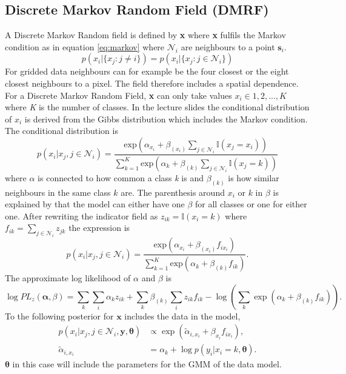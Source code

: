 \documentclass[a4paper,english]{article}
\begin{document}
\subsection{Discrete Markov Random Field (DMRF)}
A Discrete Markov Random field is defined by \textbf{x} where \textbf{x} fulfils the Markov condition as in equation \ref{eq:markov} where $\mathcal{N}_i$ are neighbours to a point $\textbf{s}_i$.
\begin{equation}
	p(x_i|\{x_j : j\neq i\}) = p(x_i|\{x_j : j\in \mathcal{N}_i\})
	\label{eq:markov}
\end{equation}
For gridded data neighbours can for example be the four closest or the eight closest neighbours to a pixel.
The field therefore includes a spatial dependence. For a Discrete Markov Random Field, \textbf{x} can only take values $x_i \in 1,2,...,K$ where \textit{K} is the number of classes. In the lecture slides the conditional distribution of $x_i$ is derived from the Gibbs distribution which includes the Markov condition. The conditional distribution is
\begin{equation}
  p(x_i|x_j,j\in \mathcal{N}_i) = \dfrac{\text{exp}(\alpha_{x_i}+\beta_{(x_i)}\sum_{j\in \mathcal{N}_i}\mathds{I}(x_j = x_i))}{\sum^K_{k=1}\text{exp}(\alpha_k + \beta_{(k)}\sum_{j\in \mathcal{N}_i}\mathds{I}(x_j = k))}
\end{equation}
where $\alpha$ is connected to how common a class \textit{k} is and $\beta_{(k)}$ is how similar neighbours in the same class $k$ are. The parenthesis around $x_i$ or $k$ in $\beta$ is explained by that the model can either have one $\beta$ for all classes or one for either one. After rewriting the indicator field as $z_{ik} = \mathds{I}(x_i = k)$ where $f_{ik} = \sum_{j\in \mathcal{N}_i} z_{jk}$ the expression is
\begin{equation}
  p(x_i|x_j,j\in \mathcal{N}_i) = \dfrac{\text{exp}(\alpha_{x_i}+\beta_{(x_i)} f_{ix_i})}{\sum^K_{k=1}\text{exp}(\alpha_k + \beta_{(k)} f_{ik})}.
\end{equation}
The approximate log likelihood of $\alpha$ and $\beta$ is
\begin{equation}
  \log PL_z(\boldsymbol{\alpha},\beta) = \sum_k \sum_i \alpha_{k} z_{ik} + \sum_k \beta_{(k)} \sum_i z_{ik}f_{ik} - \log(\sum_k \exp(\alpha_{k} + \beta_{(k)} f_{ik})).
\end{equation}
To the following posterior for $\boldsymbol{x}$ includes the data in the model,
\begin{equation}
  \begin{split}
    p(x_i|x_j,j\in \mathcal{N}_i, \boldsymbol{y}, \boldsymbol{\theta}) &\propto \exp (\tilde{\alpha}_{i, x_i}+\beta_{x_i} f_{ix_i}), \\
    \tilde{\alpha}_{i, x_i} &= \alpha_k + \log p(y_i | x_i = k, \boldsymbol{\theta}).
  \end{split}
\end{equation}
$\boldsymbol{\theta}$ in this case will include the parameters for the GMM of the data model.
\end{document}

